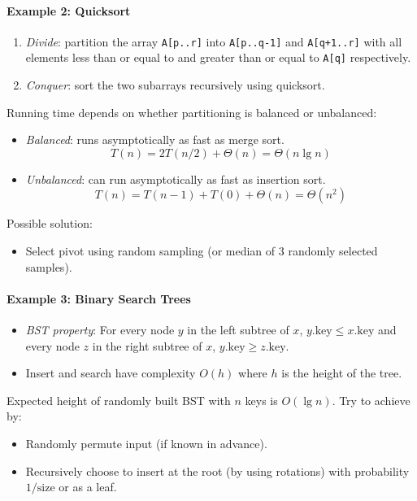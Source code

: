 \documentclass[twocolumn,english]{article}
\begin{document}
\paragraph{Example 2: Quicksort}
\begin{enumerate}
\item \emph{Divide}: partition the array \texttt{A{[}p..r{]}} into \texttt{A{[}p..q-1{]}}
and \texttt{A{[}q+1..r{]}} with all elements less than or equal to
and greater than or equal to \texttt{A{[}q{]}} respectively.
\item \emph{Conquer}: sort the two subarrays recursively using quicksort.
\end{enumerate}
Running time depends on whether partitioning is balanced or unbalanced:
\begin{itemize}
\item \emph{Balanced}: runs asymptotically as fast as merge sort.
\[
T\left(n\right)=2T\left(n/2\right)+\Theta\left(n\right)=\Theta\left(n\lg n\right)
\]
\item \emph{Unbalanced}: can run asymptotically as fast as insertion sort.
\[
T\left(n\right)=T\left(n-1\right)+T\left(0\right)+\Theta\left(n\right)=\Theta\left(n^{2}\right)
\]
\end{itemize}
Possible solution:
\begin{itemize}
\item Select pivot using random sampling (or median of 3 randomly selected
samples).
\end{itemize}

\paragraph{Example 3: Binary Search Trees}
\begin{itemize}
\item \emph{BST property}: For every node $y$ in the left subtree of $x$,
$y.\text{key}\leq x.\text{key}$ and every node $z$ in the right
subtree of $x$, $y.\text{key}\geq z.\text{key}$.
\item Insert and search have complexity $O\left(h\right)$ where $h$ is
the height of the tree.
\end{itemize}
Expected height of randomly built BST with $n$ keys is $O\left(\lg n\right)$.
Try to achieve by:
\begin{itemize}
\item Randomly permute input (if known in advance).
\item Recursively choose to insert at the root (by using rotations) with
probability $1/\text{size}$ or as a leaf.
\end{itemize}
\end{document}
